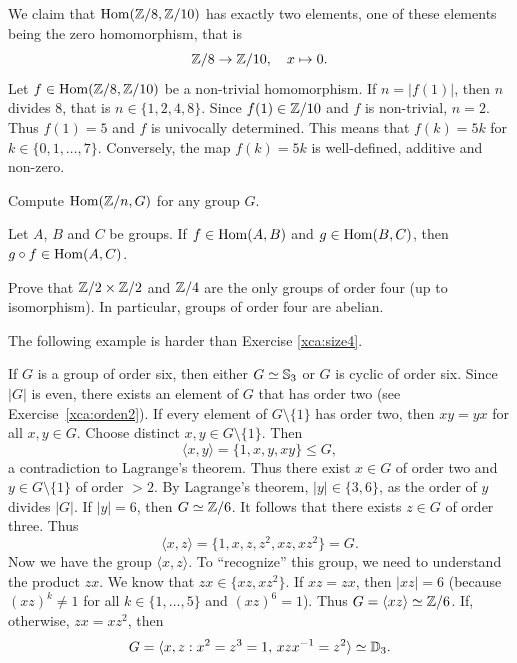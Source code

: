 \begin{example}
We claim that $\operatorname{Hom}(\mathbb{Z}/8,\mathbb{Z}/10)$ has exactly two elements,  one of these elements being 
the zero homomorphism, that is 
\[
\mathbb{Z}/8\to\mathbb{Z}/10,\quad x\mapsto 0.
\]
Let $f\in\operatorname{Hom}(\mathbb{Z}/8,\mathbb{Z}/10)$ be a non-trivial homomorphism. 
If 
$n=|f(1)|$, then 
$n$ divides $8$, that is $n\in\{1,2,4,8\}$. Since $f(1)\in\mathbb{Z}/10$ and
$f$ is non-trivial,
$n=2$. Thus $f(1)=5$ and $f$ is univocally determined. 
This means that 
$f(k)=5k$ for $k\in\{0,1,\dots,7\}$. Conversely, the map 
$f(k)=5k$ is well-defined, additive and non-zero. 
\end{example}

\begin{exercise}
Compute $\operatorname{Hom}(\mathbb{Z}/n,G)$ for any group $G$.
\end{exercise}

\begin{exercise}
Let $A$, $B$ and $C$ be groups. If $f\in\operatorname{Hom}(A,B)$ and $g\in\operatorname{Hom}(B,C)$,
then $g\circ f\in\operatorname{Hom}(A,C)$.
\end{exercise}

\begin{exercise}
\label{xca:size4}
Prove that $\mathbb{Z}/2\times\mathbb{Z}/2$ and $\mathbb{Z}/4$ are 
the only groups of order four (up to isomorphism). In particular, 
groups of order four are abelian. 
\end{exercise}

The following example is harder than
Exercise \ref{xca:size4}.

\begin{example}
If $G$ is a group of order six, then
either $G\simeq\mathbb{S}_3$ or $G$ is cyclic of order six. 
Since $|G|$ is even, there exists an element of $G$ 
that has order two (see Exercise~\ref{xca:orden2}). 
If every element of $G\setminus\{1\}$ has order two, then
$xy=yx$ for all $x,y\in G$. 
Choose distinct $x,y\in G\setminus\{1\}$. Then 
\[
\langle x,y\rangle=\{1,x,y,xy\}\leq G,
\]
a contradiction to Lagrange's theorem. Thus there exist 
$x\in G$ of order two 
and $y\in G\setminus\{1\}$ of order $>2$. 
By Lagrange's theorem, $|y|\in\{3,6\}$, 
as the order of $y$ divides $|G|$. If 
$|y|=6$, 
then $G\simeq\mathbb{Z}/6$. It follows that there exists 
$z\in G$ of order three. Thus 
\[
\langle x,z\rangle=\{1,x,z,z^2,xz,xz^2\}=G.
\]
Now we have the group $\langle x,z\rangle$. To ``recognize'' this group,
we need to understand the product $zx$. We know that
$zx\in\{xz,xz^2\}$. If $xz=zx$, then $|xz|=6$ (because
$(xz)^k\ne1$ for all $k\in\{1,\dots,5\}$ and
$(xz)^6=1$). Thus 
$G=\langle xz\rangle\simeq\mathbb{Z}/6$. If, otherwise, 
$zx=xz^2$, then 
\[
G=\langle x,z:x^2=z^3=1,\,xzx^{-1}=z^2\rangle\simeq\mathbb{D}_3.
\]
\end{example}

